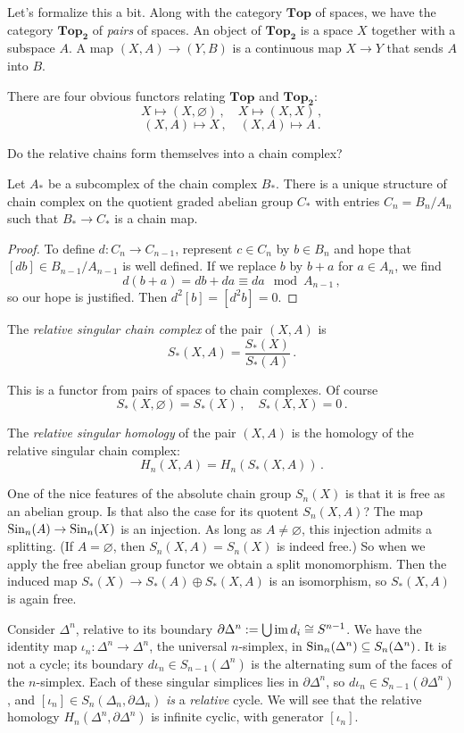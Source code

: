 Let's formalize this a bit. Along with the category $\mathbf{Top}$ of spaces,
we have the category $\mathbf{Top_2}$ of {\em pairs} of spaces. An object of
$\mathbf{Top_2}$ is a space $X$ together with a subspace $A$. A map
$(X,A)\to(Y,B)$ is a continuous map $X\to Y$ that sends $A$ into $B$. 

There are four obvious functors relating $\mathbf{Top}$ and $\mathbf{Top_2}$:
\[
X\mapsto(X,\varnothing)\,,\quad X\mapsto(X,X)\,,
\]
\[
(X,A)\mapsto X\,,\quad(X,A)\mapsto A\,.
\]

Do the relative chains form themselves into a chain complex? 
\begin{lemma}
Let $A_*$ be a subcomplex of the chain complex $B_*$. There is a unique
structure of chain complex on the quotient graded abelian group $C_*$ with 
entries $C_n=B_n/A_n$ such that $B_*\to C_*$ is a chain map.
\end{lemma}
\begin{proof}
To define $d:C_n\to C_{n-1}$, represent $c\in C_n$ by $b\in B_n$ and
hope that $[db]\in B_{n-1}/A_{n-1}$ is well defined. If we replace
$b$ by $b+a$ for $a\in A_n$, we find 
\[
d(b+a)=db+da\equiv da\mod A_{n-1}\,,
\]
so our hope is justified. Then $d^2[b]=[d^2 b]=0$. 
\end{proof}

\begin{definition} The {\em relative singular chain complex} of the pair 
$(X,A)$ is 
\[
S_*(X,A)=\frac{S_*(X)}{S_*(A)}\,.
\]
\end{definition}
This is a functor from pairs of spaces to chain complexes. Of course
\[
S_*(X,\varnothing)=S_*(X)\,,\quad S_*(X,X)=0\,.
\]

\begin{definition} The {\em relative singular homology} of the pair $(X,A)$
is the homology of the relative singular chain complex:
\[
H_n(X,A)=H_n(S_*(X,A))\,.
\]
\end{definition}

One of the nice features of the absolute chain group $S_n(X)$ is that it is free as an abelian group. Is that also the case for its quotent $S_n(X,A)$? The map $\mathrm{Sin}_n(A)\to\mathrm{Sin}_n(X)$ is an injection. As long as $A\neq\varnothing$, this injection admits a splitting. (If $A=\varnothing$, then $S_n(X,A)=S_n(X)$ is indeed free.) So when we apply the free abelian group functor we obtain a split monomorphism. Then the induced map $S_*(X)\to S_*(A)\oplus S_*(X,A)$ is an isomorphism, so $S_*(X,A)$ is again free. 

\begin{example}
Consider $\Delta^n$, relative to its boundary $\partial\Delta^n:=\bigcup \operatorname{im} d_i\cong S^{n-1}$. We have the identity map $\iota_n:\Delta^n\to \Delta^n$, the universal $n$-simplex, in $\mathrm{Sin}_n(\Delta^n)\subseteq S_n(\Delta^n)$. It is not a cycle; its boundary $d\iota_n\in S_{n-1}(\Delta^n)$ is the alternating sum of the faces of the $n$-simplex. Each of these singular simplices lies in $\partial\Delta^n$, so $d\iota_n\in S_{n-1}(\partial\Delta^n)$, and 
$[\iota_n]\in S_n(\Delta_n,\partial\Delta_n)$ {\em is} a {\em relative} cycle. 
We will see that the relative homology $H_n(\Delta^n,\partial\Delta^n)$ is infinite cyclic, with generator $[\iota_n]$. 
\end{example}
